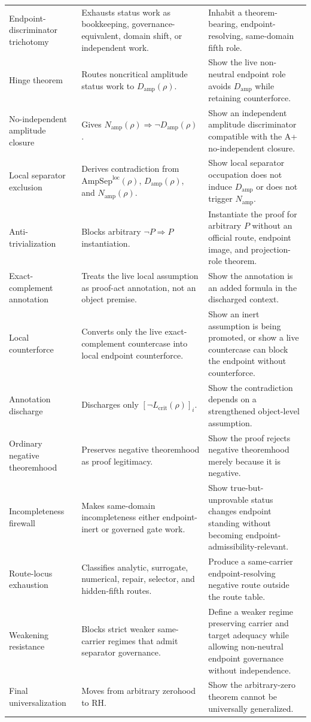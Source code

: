 \documentclass[11pt]{article}
\newcommand{\Lcrit}{L_{\mathrm{crit}}}
\newcommand{\AmpSepLoc}{\mathrm{AmpSep}^{\mathrm{loc}}}
\newcommand{\Damp}{D_{\mathrm{amp}}}
\newcommand{\Namp}{N_{\mathrm{amp}}}
\begin{document}
\begin{longtable}{L{0.21\textwidth}L{0.31\textwidth}L{0.37\textwidth}}
Endpoint-discriminator trichotomy & Exhausts status work as bookkeeping, governance-equivalent, domain shift, or independent work. & Inhabit a theorem-bearing, endpoint-resolving, same-domain fifth role.\\
Hinge theorem & Routes noncritical amplitude status work to \(\Damp(\rho)\). & Show the live non-neutral endpoint role avoids \(\Damp\) while retaining counterforce.\\
No-independent amplitude closure & Gives \(\Namp(\rho)\Rightarrow\neg\Damp(\rho)\). & Show an independent amplitude discriminator compatible with the A+ no-independent closure.\\
Local separator exclusion & Derives contradiction from \(\AmpSepLoc(\rho)\), \(\Damp(\rho)\), and \(\Namp(\rho)\). & Show local separator occupation does not induce \(\Damp\) or does not trigger \(\Namp\).\\
Anti-trivialization & Blocks arbitrary \(\neg P\Rightarrow P\) instantiation. & Instantiate the proof for arbitrary \(P\) without an official route, endpoint image, and projection-role theorem.\\
Exact-complement annotation & Treats the live local assumption as proof-act annotation, not an object premise. & Show the annotation is an added formula in the discharged context.\\
Local counterforce & Converts only the live exact-complement countercase into local endpoint counterforce. & Show an inert assumption is being promoted, or show a live countercase can block the endpoint without counterforce.\\
Annotation discharge & Discharges only \([\neg\Lcrit(\rho)]_i\). & Show the contradiction depends on a strengthened object-level assumption.\\
Ordinary negative theoremhood & Preserves negative theoremhood as proof legitimacy. & Show the proof rejects negative theoremhood merely because it is negative.\\
Incompleteness firewall & Makes same-domain incompleteness either endpoint-inert or governed gate work. & Show true-but-unprovable status changes endpoint standing without becoming endpoint-admissibility-relevant.\\
Route-locus exhaustion & Classifies analytic, surrogate, numerical, repair, selector, and hidden-fifth routes. & Produce a same-carrier endpoint-resolving negative route outside the route table.\\
Weakening resistance & Blocks strict weaker same-carrier regimes that admit separator governance. & Define a weaker regime preserving carrier and target adequacy while allowing non-neutral endpoint governance without independence.\\
Final universalization & Moves from arbitrary zerohood to RH. & Show the arbitrary-zero theorem cannot be universally generalized.\\
\bottomrule
\end{longtable}
\endgroup
\end{document}
